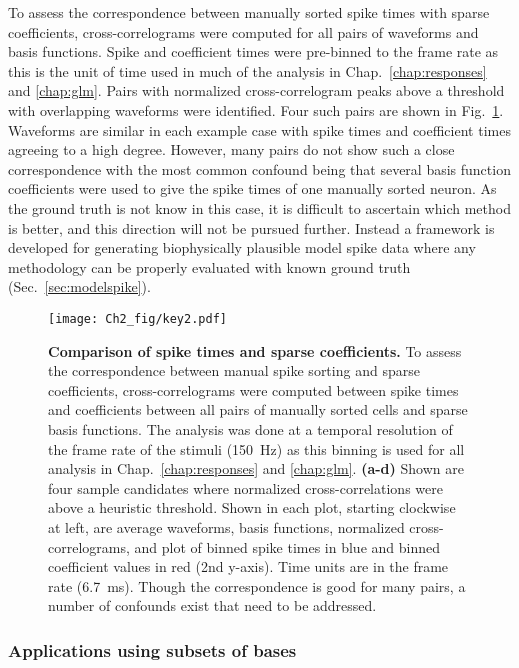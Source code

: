 To assess the correspondence between manually sorted spike times with
sparse coefficients, cross-correlograms were computed for all pairs of
waveforms and basis functions. Spike and coefficient times were
pre-binned to the frame rate as this is the unit of time used in much
of the analysis in Chap.~\ref{chap:responses} and
\ref{chap:glm}. Pairs with normalized cross-correlogram peaks above a
threshold with overlapping waveforms were identified. Four such pairs
are shown in Fig.~\ref{fig:comparespikes}. Waveforms are similar in
each example case with spike times and coefficient times agreeing to a
high degree. However, many pairs do not show such a close
correspondence with the most common confound being that several basis
function coefficients were used to give the spike times of one
manually sorted neuron. As the ground truth is not know in this case,
it is difficult to ascertain which method is better, and this
direction will not be pursued further. Instead a framework is
developed for generating biophysically plausible model spike data
where any methodology can be properly evaluated with known ground
truth~\cite{einevoll:2011sp} (Sec.~\ref{sec:modelspike}).

\begin{figure}[htp!]
  \centering
  \texttt{[image: Ch2\_fig/key2.pdf]}
  \caption{\textbf{Comparison of spike times and sparse coefficients.}
    To assess the correspondence between manual spike sorting and
    sparse coefficients, cross-correlograms were computed between
    spike times and coefficients between all pairs of manually sorted
    cells and sparse basis functions. The analysis was done at a
    temporal resolution of the frame rate of the stimuli (150~Hz) as
    this binning is used for all analysis in
    Chap.~\ref{chap:responses} and \ref{chap:glm}. \textbf{(a-d)}
    Shown are four sample candidates where normalized
    cross-correlations were above a heuristic threshold. Shown in each
    plot, starting clockwise at left, are average waveforms, basis
    functions, normalized cross-correlograms, and plot of binned spike
    times in blue and binned coefficient values in red (2nd
    y-axis). Time units are in the frame rate (6.7~ms). Though the
    correspondence is good for many pairs, a number of confounds exist
    that need to be addressed.}
  \label{fig:comparespikes}
\end{figure}
\afterpage{\clearpage}

\subsubsection{Applications using subsets of bases}

